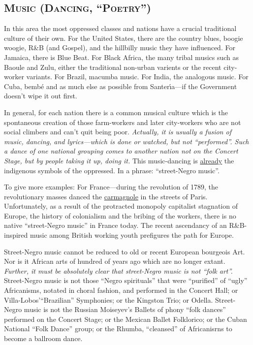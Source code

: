 \subsection*{\textsc{Music (Dancing, \enquote{Poetry})}}

In this area the most oppressed classes and nations have a crucial traditional
culture of their own. For the United States, there are the country blues, 
boogie woogie, R\&B (and Gospel), and the hillbilly music they have influenced.
For Jamaica, there is Blue Beat. For Black Africa, the many tribal musics such
as Baoule and Zulu, either the traditional non-urban varients or the recent 
city-worker variants. For Brazil, macumba music. For India, the analogous music.
For Cuba, bemb\'{e} and as much else as possible from Santer\'{\i}a---if the Government
doesn't wipe it out first. 

In general, for each nation there is a common musical culture which is the
spontaneous creation of those farm-workers and later city-workers who are not
social climbers and can't quit being poor. \emph{Actually, it is usually a fusion of music, dancing, and lyrics---which is done or watched, but not \enquote{performed}. Such a dance of one national grouping comes to another nation not on the Concert Stage, but by people taking it up, doing it.} 
This music-dancing is \uline{already} the indigenous symbols of the oppressed.
In a phrase: \enquote{street-Negro music}. 

To give more examples: For France---during the revolution of 1789, the 
revolutionary masses danced the \uline{carmagnole} in the streets of Paris. Unfortunately,
as a result of the protracted monopoly capitalist stagnation of Europe,
the history of colonialism and the bribing of the workers, there is no native
\enquote{street-Negro music} in France today. The recent ascendancy of an R\&B-inspired
music among British working youth prefigures the path for Europe. 

Street-Negro music cannot be reduced to old or recent European bourgeois Art. 
Nor is it African arts of hundred of years ago which are no longer extant. 
\emph{Further, it must be absolutely clear that street-Negro music is not \enquote{folk art}.}
Street-Negro music is not those \enquote{Negro spirituals} that were \enquote{purified} of 
\enquote{ugly} Africanisms, notated in choral fashion, and performed in the Concert
Hall; or Villa-Lobos'\enquote{Brazilian} Symphonies; or the Kingston Trio; or Odella.
Street-Negro music is not the Russian Moiseyev's Ballets of phony \enquote{folk dances}
performed on the Concert Stage; or the Mexican Ballet Folklorico; or the Cuban
National \enquote{Folk Dance} group; or the Rhumba, \enquote{cleansed} of Africanisrns to become
a ballroom dance. 

